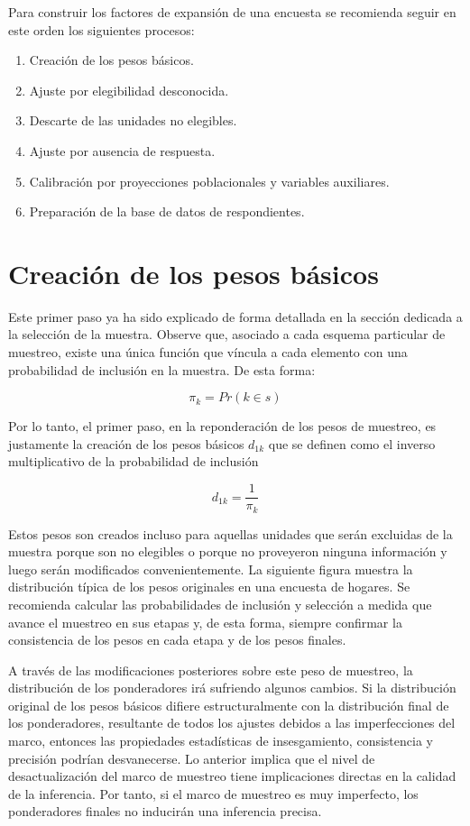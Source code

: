 \documentclass[
  10pt,
  spanish,
]{book}
\providecommand{\tightlist}{%
  \setlength{\itemsep}{0pt}\setlength{\parskip}{0pt}}
\begin{document}
Para construir los factores de expansión de una encuesta se recomienda seguir en este orden los siguientes procesos:

\begin{enumerate}
\def\labelenumi{\arabic{enumi}.}
\tightlist
\item
  Creación de los pesos básicos.
\item
  Ajuste por elegibilidad desconocida.
\item
  Descarte de las unidades no elegibles.
\item
  Ajuste por ausencia de respuesta.
\item
  Calibración por proyecciones poblacionales y variables auxiliares.
\item
  Preparación de la base de datos de respondientes.
\end{enumerate}

\hypertarget{creaciuxf3n-de-los-pesos-buxe1sicos}{%
\section{Creación de los pesos básicos}\label{creaciuxf3n-de-los-pesos-buxe1sicos}}

Este primer paso ya ha sido explicado de forma detallada en la sección dedicada a la selección de la muestra. Observe que, asociado a cada esquema particular de muestreo, existe una única función que víncula a cada elemento con una probabilidad de inclusión en la muestra. De esta forma:

\[\pi_k = Pr (k \in s)\]

Por lo tanto, el primer paso, en la reponderación de los pesos de muestreo, es justamente la creación de los pesos básicos \(d_{1k}\) que se definen como el inverso multiplicativo de la probabilidad de inclusión

\[d_{1k} = \frac{1}{\pi_k}\]

Estos pesos son creados incluso para aquellas unidades que serán excluidas de la muestra porque son no elegibles o porque no proveyeron ninguna información y luego serán modificados convenientemente. La siguiente figura muestra la distribución típica de los pesos originales en una encuesta de hogares. Se recomienda calcular las probabilidades de inclusión y selección a medida que avance el muestreo en sus etapas y, de esta forma, siempre confirmar la consistencia de los pesos en cada etapa y de los pesos finales.

A través de las modificaciones posteriores sobre este peso de muestreo, la distribución de los ponderadores irá sufriendo algunos cambios. Si la distribución original de los pesos básicos difiere estructuralmente con la distribución final de los ponderadores, resultante de todos los ajustes debidos a las imperfecciones del marco, entonces las propiedades estadísticas de insesgamiento, consistencia y precisión podrían desvanecerse. Lo anterior implica que el nivel de desactualización del marco de muestreo tiene implicaciones directas en la calidad de la inferencia. Por tanto, si el marco de muestreo es muy imperfecto, los ponderadores finales no inducirán una inferencia precisa.
\end{document}
